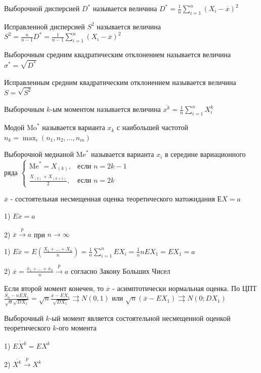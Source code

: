 \documentclass[12pt]{article}
\begin{document}
\Defs Выборочной дисперсией $D^*$ называется величина $D^* = \frac{1}{n} \sum_{i = 1}^n (X_i - \overline{x})^2$

\Defs Исправленной дисперсией $S^2$ называется величина $S^2 = \frac{n}{n - 1} D^* = \frac{1}{n - 1} \sum_{i = 1}^n (X_i - \overline{x})^2$

\Defs Выборочным средним квадратическим отклонением называется величина $\sigma^* = \sqrt{D^*}$

\Defs Исправленным средним квадратическим отклонением называется величина $S = \sqrt{S^2}$

\Defs Выборочным $k$-ым моментом называется величина $\overline{x^k} = \frac{1}{n} \sum_{i = 1}^n X_i^k$

\Defs Модой $\mathrm{Mo}^*$ называется варианта $x_k$ с наибольшей частотой $n_k = \max_i (n_1, n_2, \dots, n_m)$

\Defs Выборочной медианой $\mathrm{Me}^*$ называется варианта $x_i$ в середине вариационного ряда $\begin{cases}\mathrm{Me}^* = 
X_{(k)}, & \text{если } n = 2k - 1 \\ \frac{X_{(k)} + X_{(k + 1)}}{2}, & \text{если } n = 2k\end{cases}$

\begin{MyTheorem}
    \Ths $\overline{x}$ - состоятельная несмещенная оценка теоретического матожидания $ЕX = a$

    1) $E \overline{x} = a$

    2) $\overline{x} \overset{p}{\longrightarrow} a$ при $n \to \infty$
\end{MyTheorem}

\begin{MyProof}
    1) $E \overline{x} = E\left(\frac{X_1 + \dots + X_n}{n}\right) = \frac{1}{n} \sum_{i = 1}^n E X_i = 
    \frac{1}{n} n E X_1 = E X_1 = a$

    2) $\overline{x} = \frac{\overline{x}_1 + \dots + \overline{x}_n}{n} \overset{p}{\longrightarrow} a$ 
    согласно Закону Больших Чисел
\end{MyProof}

\Nota Если второй момент конечен, то $\overline{x}$ - асимптотически нормальная оценка. По ЦПТ $\frac{S_n - n E X_1}{\sqrt{n} \sqrt{D X_1}} = \sqrt{n} \frac{\overline{x} - E X_1}{\sqrt{D X_1}} \rightrightarrows N(0, 1)$
или $\sqrt{n} (\overline{x} - E X_1) \rightrightarrows N(0; D X_1)$

\begin{MyTheorem}
    \Ths Выборочный $k$-ый момент является состоятельной несмещенной оценкой теоретического $k$-ого момента

    1) $\overline{E X^k} = E X^k$

    2) $\overline{X^k} \overset{p}{\longrightarrow} X^k$
\end{MyTheorem}
\end{document}
